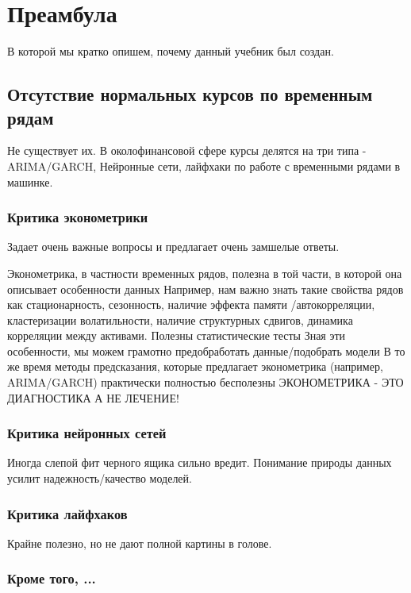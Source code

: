\chapter{Преамбула}
В которой мы кратко опишем, почему данный учебник был создан.

\section{Отсутствие нормальных курсов по временным рядам}

Не существует их. В околофинансовой сфере курсы делятся на три типа - ARIMA/GARCH, Нейронные сети, лайфхаки по работе с временными рядами в машинке.

\subsection{Критика эконометрики}

Задает очень важные вопросы и предлагает очень замшелые ответы.

Эконометрика, в частности временных рядов, полезна в той части, в которой она описывает особенности данных
Например, нам важно знать такие свойства рядов как стационарность, сезонность, наличие эффекта памяти /автокорреляции, кластеризации волатильности, наличие структурных сдвигов, динамика корреляции между активами. Полезны статистические тесты
Зная эти особенности, мы можем грамотно предобработать данные/подобрать модели
В то же время методы предсказания, которые предлагает эконометрика (например, ARIMA/GARCH) практически полностью бесполезны
ЭКОНОМЕТРИКА - ЭТО ДИАГНОСТИКА А НЕ ЛЕЧЕНИЕ!

\subsection{Критика нейронных сетей}

Иногда слепой фит черного ящика сильно вредит. Понимание природы данных усилит надежность/качество моделей.

\subsection{Критика лайфхаков}

Крайне полезно, но не дают полной картины в голове.

\subsection{Кроме того, ...}

